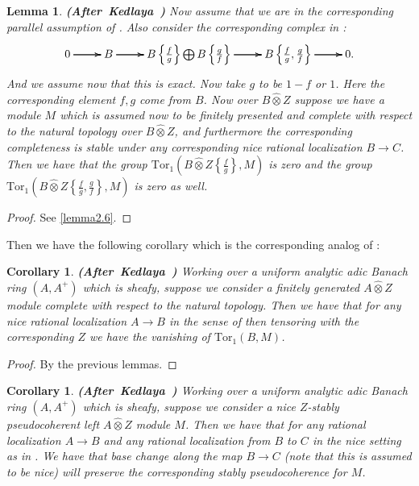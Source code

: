 \documentclass[12pt]{amsart}
\newtheorem{lemma}[theorem]{Lemma}
\newtheorem{corollary}[theorem]{Corollary}
\theoremstyle{definition}
\numberwithin{equation}{section}
\begin{document}
\begin{lemma} \mbox{\bf{(After Kedlaya \cite[Lemma 1.9.4]{Ked2})}}
Now assume that we are in the corresponding parallel assumption of \cite[1.7.1]{Ked2}. Also consider the corresponding complex in \cite[1.6.15.1]{Ked2}:
\[
\xymatrix@C+0pc@R+0pc{
0 \ar[r] \ar[r] \ar[r] &B \ar[r] \ar[r] \ar[r] &B\left\{\frac{f}{g}\right\}\bigoplus B\left\{\frac{g}{f}\right\} \ar[r] \ar[r] \ar[r] &B\left\{\frac{f}{g},\frac{g}{f}\right\} \ar[r] \ar[r] \ar[r] &0.
}
\]	
And we assume now that this is exact. Now take $g$ to be $1-f$ or $1$. Here the corresponding element $f,g$ come from $B$. Now over $B\widehat{\otimes}Z$ suppose we have a module $M$ which is assumed now to be finitely presented and complete with respect to the natural topology over $B\widehat{\otimes}Z$, and furthermore the corresponding completeness is stable under any corresponding nice rational localization $B\rightarrow C$. Then we have that the group $\mathrm{Tor}_1(B\widehat{\otimes}Z\left\{\frac{f}{g}\right\},M)$ is zero and the group $\mathrm{Tor}_1(B\widehat{\otimes}Z\left\{\frac{f}{g},\frac{g}{f}\right\},M)$ is zero as well. 	
\end{lemma}

\begin{proof}
See \cref{lemma2.6}.
\end{proof}



\indent Then we have the following corollary which is the corresponding analog of \cite[Corollary 1.9.5]{Ked2}:


\begin{corollary}\mbox{\bf{(After Kedlaya \cite[Corollary 1.9.5]{Ked2})}}
Working over a uniform analytic adic Banach ring $(A,A^+)$ which is sheafy, suppose we consider a finitely generated $A\widehat{\otimes}Z$ module complete with respect to the natural topology. Then we have that for any nice rational localization $A\rightarrow B$ in the sense of \cite[Definition 1.9.1]{Ked2} then tensoring with the corresponding $Z$ we have the vanishing of $\mathrm{Tor}_1(B,M)$.
	
\end{corollary}



\begin{proof}
By the previous lemmas.	
\end{proof}


\begin{corollary}\mbox{\bf{(After Kedlaya \cite[Corollary 1.9.6]{Ked2})}}
Working over a uniform analytic adic Banach ring $(A,A^+)$ which is sheafy, suppose we consider a nice $Z$-stably pseudocoherent left $A\widehat{\otimes}Z$ module $M$. Then we have that for any rational localization $A\rightarrow B$ and any rational localization from $B$ to $C$ in the nice setting as in \cite[Definition 1.9.1]{Ked2}. We have that base change along the map $B\rightarrow C$ (note that this is assumed to be nice) will preserve the corresponding stably pseudocoherence for $M$.

\end{corollary}
\end{document}
